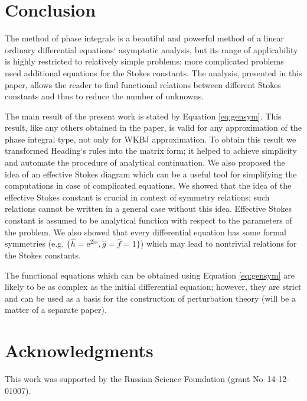 \documentclass[atmp]{ipart_v1}
\def\rme{\mathrm{e}}
\def\rmi{\mathrm{i}}
\def\f{\hat{f}}
\def\g{\hat{g}}
\def\h{\hat{h}}
\def\unity{1}
\newcommand\Eref[1]{Equation \ref{#1}}
\begin{document}
\section{Conclusion \label{sec:cnclsns}}

The method of phase integrals is a beautiful and powerful method of a linear ordinary 
differential equations` asymptotic analysis, but its range of applicability is highly 
restricted to relatively simple problems; more complicated problems need additional equations 
for the Stokes constants. The analysis, presented in this paper, allows the reader to find 
functional relations between different Stokes constants and thus to reduce the number of unknowns.

The main result of the present work is stated by \Eref{eq:gensym}. This result, 
like any others obtained in the paper, is valid for any approximation of the 
phase integral type, not only for WKBJ approximation. To obtain this result 
we transformed Heading`s rules \cite{heading,white} into the matrix form; 
it helped to achieve simplicity and automate the procedure of analytical continuation. 
We also proposed the idea of an effective Stokes diagram which can be a useful tool 
for simplifying the computations in case of complicated equations. 
We showed that the idea of the effective Stokes constant is crucial in context of symmetry relations;
such relations cannot be written in a general case without this idea. 
Effective Stokes constant is assumed to be analytical function with respect to 
the parameters of the problem. 
We also showed that every differential 
equation has some formal symmetries (e.g. $\{\h=\rme^{2\rmi\pi},\g=\f=\unity\}$) which may lead
to nontrivial relations for the Stokes constants. 

The functional equations which can be obtained using \Eref{eq:gensym} are likely to be as 
complex as the initial differential equation; however, they are strict and can be used as 
a basis for the construction of perturbation theory (will be a matter of a separate paper).

\section*{Acknowledgments}
This work was supported by the Russian Science Foundation (grant No~14-12-01007). 
\end{document}
